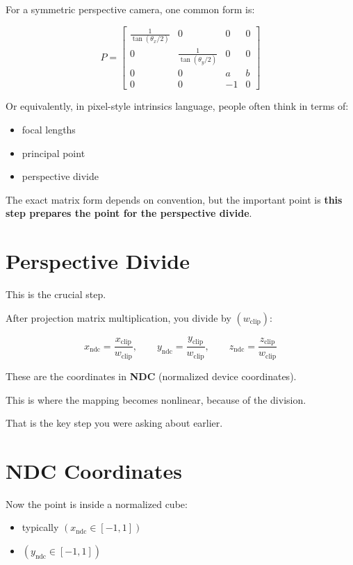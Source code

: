 \documentclass[11pt,letterpaper]{article}
\begin{document}
For a symmetric perspective camera, one common form is:

\[
P =
\begin{bmatrix}
\frac{1}{\tan(\theta_x/2)} & 0 & 0 & 0\\
0 & \frac{1}{\tan(\theta_y/2)} & 0 & 0\\
0 & 0 & a & b\\
0 & 0 & -1 & 0
\end{bmatrix}
\]

Or equivalently, in pixel-style intrinsics language, people often think in terms of:

\begin{itemize}
\item focal lengths
\item principal point
\item perspective divide
\end{itemize}

The exact matrix form depends on convention, but the important point is \textbf{this step prepares the point for the perspective divide}.

\section{Perspective Divide}

This is the crucial step.

After projection matrix multiplication, you divide by $(w_{\text{clip}})$:

\[
x_{\text{ndc}} = \frac{x_{\text{clip}}}{w_{\text{clip}}},\qquad
y_{\text{ndc}} = \frac{y_{\text{clip}}}{w_{\text{clip}}},\qquad
z_{\text{ndc}} = \frac{z_{\text{clip}}}{w_{\text{clip}}}
\]

These are the coordinates in \textbf{NDC} (normalized device coordinates).

This is where the mapping becomes nonlinear, because of the division.

That is the key step you were asking about earlier.

\section{NDC Coordinates}

Now the point is inside a normalized cube:

\begin{itemize}
\item typically $(x_{\text{ndc}} \in [-1,1])$
\item $(y_{\text{ndc}} \in [-1,1])$
\end{itemize}
\end{document}
